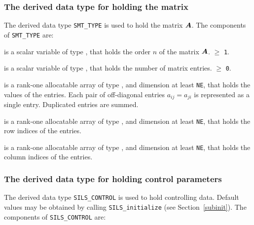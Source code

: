 \documentclass{galahad}
\newcommand{\packagename}{SILS}
\begin{document}

\subsubsection{The derived data type for holding the matrix}\label{typeprob}
The derived data type {\tt SMT\_TYPE} is used to hold the matrix ${\bm{A}}$. 
The components of {\tt SMT\_TYPE} are:

\begin{description}

 is a scalar variable of type \integer, that holds
the order $n$ of the matrix  ${\bm{A}}$. 
 $\geq$ {\tt 1}. 

 is a scalar variable of type \integer, that holds the 
number of matrix entries.  
 $\geq$ {\tt 0}.

 is a rank-one allocatable array of type \realdp, 
and dimension at least {\tt NE}, that holds the values of the entries. 
Each pair of off-diagonal entries $a_{ij} = a_{ji} $ 
is represented as a single entry. Duplicated entries are summed. 

 is a rank-one allocatable array of type \integer, 
and dimension at least {\tt NE}, that holds the row indices of the entries. 

 is a rank-one allocatable array of type \integer, 
and dimension at least {\tt NE}, that holds the column indices of the entries. 

\end{description}


\subsubsection{The derived data type for holding control 
 parameters}\label{typecontrol}
The derived data type 
{\tt \packagename\_CONTROL} 
is used to hold controlling data. Default values may be obtained by calling 
{\tt \packagename\_initialize}
(see Section~\ref{subinit}). The components of 
{\tt \packagename\_CONTROL} 
are:
\end{document}
